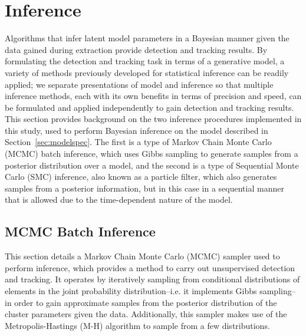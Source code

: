 \documentclass[smallcondensed, final]{svjour3}
\begin{document}
\section{Inference}
\label{sec:inference}
Algorithms that infer latent model parameters in a Bayesian manner given the data gained during extraction provide detection and tracking results. By formulating the detection and tracking task in terms of a generative model, a variety of methods previously developed for statistical inference can be readily applied; we separate presentations of model and inference so that multiple inference methods, each with its own benefits in terms of precision and speed, can be formulated and applied independently to gain detection and tracking results. This section provides background on the two inference procedures implemented in this study, used to perform Bayesian inference on the model described in Section~\ref{sec:modelspec}. The first is a type of Markov Chain Monte Carlo (MCMC) batch inference, which uses Gibbs sampling to generate samples from a posterior distribution over a model, and the second is a type of Sequential Monte Carlo (SMC) inference, also known as a particle filter, which also generates samples from a posterior information, but in this case in a sequential manner that is allowed due to the time-dependent nature of the model.


\subsection{MCMC Batch Inference}
\label{sec:MCMC}

This section details a Markov Chain Monte Carlo (MCMC) sampler used to perform inference, which provides a method to carry out unsupervised detection and tracking. It operates by iteratively sampling from conditional distributions of elements in the joint probability distribution--i.e. it implements Gibbs sampling--in order to gain approximate samples from the posterior distribution of the cluster parameters given the data. Additionally, this sampler makes use of the Metropolis-Hastings (M-H) algorithm to sample from a few distributions.
\end{document}
